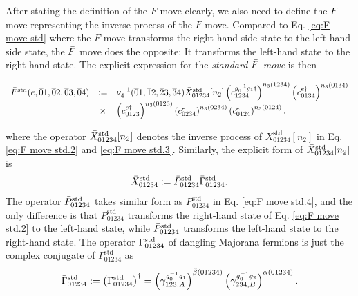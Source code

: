 \documentclass[%
 reprint,
 amsmath,amssymb,
 aps,
prb,
]{revtex4-2}
\begin{document}
After stating the definition of the $F$ move clearly, we also need to define the $\Bar{F}$ move representing the inverse process of the $F$ move.
Compared to Eq. \eqref{eq:F move std} where the $F$ move transforms the right-hand side state to the left-hand side state, the $\Bar{F}$ move does the opposite: It transforms the left-hand state to the right-hand state.
The explicit expression for the \textit{standard $\Bar{F}$ move} is then 
\begin{widetext}
\begin{equation}
\begin{array}{ c c l }
\Bar{F}^{\mathrm{std}}( e,\overline{0} 1,\overline{0} 2,\overline{0} 3,\overline{0} 4) & := & \nu ^{-1}_{4}(\overline{0} 1,\overline{1} 2,\overline{2} 3,\overline{3} 4) \Bar{X}_{01234}^{\mathrm{std}}[ n_{2}] \left( c_{1234}^{g_{0}^{-1} g_{1} \dagger} \right) ^{n_{3}( 1234)} \left( c_{0134}^{e \dagger} \right) ^{n_{3}( 0134)} \\ 
& \times  & \left( c_{0123}^{e \dagger} \right) ^{n_{3}( 0123)} \left( c_{0234}^{e} \right) ^{n_{3}( 0234)} \left( c_{0124}^{e} \right) ^{n_{3}( 0124)} ,\label{eq:Fbar std}
\end{array}
\end{equation}
\end{widetext}
where the operator $\Bar{X}_{01234}^{\mathrm{std}}[ n_{2}]$ denotes the inverse process of $X_{01234}^{\mathrm{std}}[ n_{2}]$ in Eq. \eqref{eq:F move std.2} and \eqref{eq:F move std.3}.
Similarly, the explicit form of $\Bar{X}_{01234}^{\mathrm{std}}[ n_{2}]$ is 
\begin{equation}
\Bar{X}_{01234}^{\mathrm{std}} := \Bar{P}_{01234}^{\mathrm{std}} \Bar{\Gamma}_{01234}^{\mathrm{std}} .\label{eq:Fbar std.1}
\end{equation}
The operator $\Bar{P}_{01234}^{\mathrm{std}}$ takes similar form as $P_{01234}^{\mathrm{std}}$ in Eq. \eqref{eq:F move std.4}, and the only difference is that $P_{01234}^{\mathrm{std}}$ transforms the right-hand state of Eq. \eqref{eq:F move std.2} to the left-hand state, while $\Bar{P}_{01234}^{\mathrm{std}}$ transforms the left-hand state to the right-hand state.
The operator $\Bar{\Gamma}_{01234}^{\mathrm{std}}$ of dangling Majorana fermions is just the complex conjugate of $\Gamma_{01234}^{\mathrm{std}}$ as 
\begin{equation}
\Bar{\Gamma}_{01234}^{\mathrm{std}} := \left( \Gamma_{01234}^{\mathrm{std}} \right) ^{\dagger} = \left( \gamma _{123,A}^{g^{-1}_0 g_1} \right) ^{\tilde{\beta}(01234)} \left( \gamma _{234,B}^{g^{-1}_0 g_2} \right) ^{\tilde{\alpha}(01234)} .\label{eq:Fbar std.2}
\end{equation}
\end{document}
